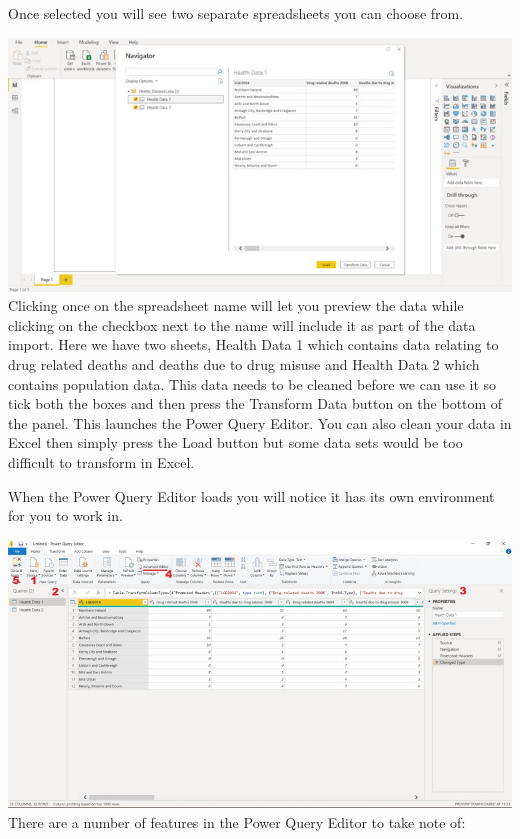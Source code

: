\documentclass[
]{book}
\begin{document}
Once selected you will see two separate spreadsheets you can choose from.

\includegraphics{bi2.jpg}
Clicking once on the spreadsheet name will let you preview the data while clicking on the checkbox next to the name will include it as part of the data import. Here we have two sheets, Health Data 1 which contains data relating to drug related deaths and deaths due to drug misuse and Health Data 2 which contains population data. This data needs to be cleaned before we can use it so tick both the boxes and then press the Transform Data button on the bottom of the panel. This launches the Power Query Editor. You can also clean your data in Excel then simply press the Load button but some data sets would be too difficult to transform in Excel.

When the Power Query Editor loads you will notice it has its own environment for you to work in.

\includegraphics{bi3.jpg}
There are a number of features in the Power Query Editor to take note of:
\end{document}
